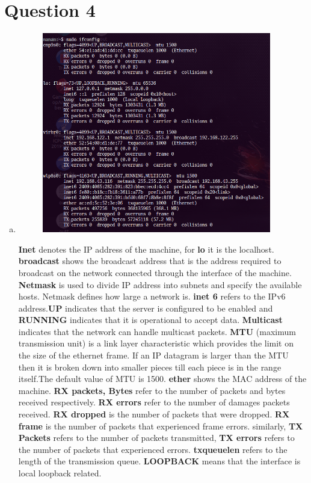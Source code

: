 \documentclass[a4paper,10pt]{article}
\newlength{\strutheight}
\begin{document}
\section*{Question 4}
\begin{enumerate}[a)]
	\item
	\begin{adjustbox}{valign=T,raise=\strutheight,minipage={\linewidth}}
		\begin{figure}
			\includegraphics[width=10cm]{ifconfig.png}
		\end{figure}
		\strut{}
		\textbf{Inet} denotes the IP address of the machine, for \textbf{lo} it is the localhost. \textbf{broadcast} shows the broadcast address that is the address required to broadcast on the network connected through the interface of the machine. \textbf{Netmask} is used to divide IP address into subnets and specify the available hosts. Netmask defines how large a network is. \textbf{inet 6} refers to the IPv6 address.\textbf{UP} indicates that the server is configured to be enabled and \textbf{RUNNING} indicates that it is operational to accept data. \textbf{Multicast} indicates that the network can handle multicast packets. \textbf{MTU} (maximum transmission unit) is a link layer characteristic which provides the limit on the size of the ethernet frame. If an IP datagram is larger than the MTU then it is broken down into smaller pieces till each piece is in the range itself.The default value of MTU is 1500. \textbf{ether} shows the MAC address of the machine. \textbf{RX packets, Bytes} refer to the number of packets and bytes received respectively. \textbf{RX errors} refer to the number of damages packets received. \textbf{RX dropped} is the number of packets that were dropped. \textbf{RX frame} is the number of packets that experienced frame errors. similarly, \textbf{TX Packets} refers to the number of packets transmitted, \textbf{TX errors} refers to the number of packets that experienced errors. \textbf{txqueuelen} refers to the length of the transmission queue. \textbf{LOOPBACK} means that the interface is local loopback related.

\end{adjustbox}
\end{enumerate}
\end{document}
